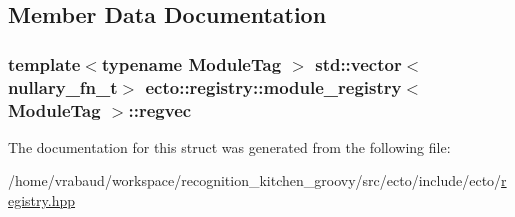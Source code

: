 \subsection{\-Member \-Data \-Documentation}
\hypertarget{structecto_1_1registry_1_1module__registry_a77ae3e886433428c82d5dbb8039d53f6}{
\subsubsection[{regvec}]{\setlength{\rightskip}{0pt plus 5cm}template$<$typename Module\-Tag $>$ std\-::vector$<${\bf nullary\-\_\-fn\-\_\-t}$>$ {\bf ecto\-::registry\-::module\-\_\-registry}$<$ \-Module\-Tag $>$\-::{\bf regvec}}}\label{structecto_1_1registry_1_1module__registry_a77ae3e886433428c82d5dbb8039d53f6}


\-The documentation for this struct was generated from the following file\-:\begin{DoxyCompactItemize}
\item 
/home/vrabaud/workspace/recognition\-\_\-kitchen\-\_\-groovy/src/ecto/include/ecto/\hyperlink{registry_8hpp}{registry.\-hpp}\end{DoxyCompactItemize}

